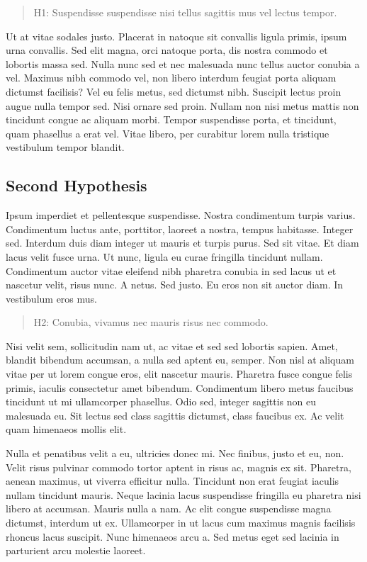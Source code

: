 \documentclass[
  12,
]{article}
\begin{document}
\begin{quote}
H1: Suspendisse suspendisse nisi tellus sagittis mus vel lectus tempor.
\end{quote}

Ut at vitae sodales justo. Placerat in natoque sit convallis ligula
primis, ipsum urna convallis. Sed elit magna, orci natoque porta, dis
nostra commodo et lobortis massa sed. Nulla nunc sed et nec malesuada
nunc tellus auctor conubia a vel. Maximus nibh commodo vel, non libero
interdum feugiat porta aliquam dictumst facilisis? Vel eu felis metus,
sed dictumst nibh. Suscipit lectus proin augue nulla tempor sed. Nisi
ornare sed proin. Nullam non nisi metus mattis non tincidunt congue ac
aliquam morbi. Tempor suspendisse porta, et tincidunt, quam phasellus a
erat vel. Vitae libero, per curabitur lorem nulla tristique vestibulum
tempor blandit.

\hypertarget{second-hypothesis}{%
\subsection{Second Hypothesis}\label{second-hypothesis}}

Ipsum imperdiet et pellentesque suspendisse. Nostra condimentum turpis
varius. Condimentum luctus ante, porttitor, laoreet a nostra, tempus
habitasse. Integer sed. Interdum duis diam integer ut mauris et turpis
purus. Sed sit vitae. Et diam lacus velit fusce urna. Ut nunc, ligula eu
curae fringilla tincidunt nullam. Condimentum auctor vitae eleifend nibh
pharetra conubia in sed lacus ut et nascetur velit, risus nunc. A netus.
Sed justo. Eu eros non sit auctor diam. In vestibulum eros mus.

\begin{quote}
H2: Conubia, vivamus nec mauris risus nec commodo.
\end{quote}

Nisi velit sem, sollicitudin nam ut, ac vitae et sed sed lobortis
sapien. Amet, blandit bibendum accumsan, a nulla sed aptent eu, semper.
Non nisl at aliquam vitae per ut lorem congue eros, elit nascetur
mauris. Pharetra fusce congue felis primis, iaculis consectetur amet
bibendum. Condimentum libero metus faucibus tincidunt ut mi ullamcorper
phasellus. Odio sed, integer sagittis non eu malesuada eu. Sit lectus
sed class sagittis dictumst, class faucibus ex. Ac velit quam himenaeos
mollis elit.

Nulla et penatibus velit a eu, ultricies donec mi. Nec finibus, justo et
eu, non. Velit risus pulvinar commodo tortor aptent in risus ac, magnis
ex sit. Pharetra, aenean maximus, ut viverra efficitur nulla. Tincidunt
non erat feugiat iaculis nullam tincidunt mauris. Neque lacinia lacus
suspendisse fringilla eu pharetra nisi libero at accumsan. Mauris nulla
a nam. Ac elit congue suspendisse magna dictumst, interdum ut ex.
Ullamcorper in ut lacus cum maximus magnis facilisis rhoncus lacus
suscipit. Nunc himenaeos arcu a. Sed metus eget sed lacinia in
parturient arcu molestie laoreet.
\end{document}
